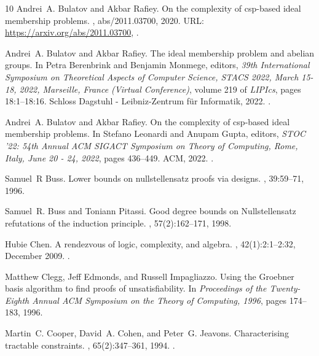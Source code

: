 \documentclass[11pt]{article}
\newcommand{\1}{\textbf{1}}
\begin{document}
\begin{thebibliography}{10}
Andrei~A. Bulatov and Akbar Rafiey.
\newblock On the complexity of csp-based ideal membership problems.
, abs/2011.03700, 2020.
\newblock URL: \url{https://arxiv.org/abs/2011.03700}, \href {https://arxiv.org/abs/2011.03700} {}.

Andrei~A. Bulatov and Akbar Rafiey.
\newblock The ideal membership problem and abelian groups.
\newblock In Petra Berenbrink and Benjamin Monmege, editors, {\em 39th International Symposium on Theoretical Aspects of Computer Science, {STACS} 2022, March 15-18, 2022, Marseille, France (Virtual Conference)}, volume 219 of {\em LIPIcs}, pages 18:1--18:16. Schloss Dagstuhl - Leibniz-Zentrum f{\"{u}}r Informatik, 2022.
\newblock \href {https://doi.org/10.4230/LIPIcs.STACS.2022.18} {}.

Andrei~A. Bulatov and Akbar Rafiey.
\newblock On the complexity of csp-based ideal membership problems.
\newblock In Stefano Leonardi and Anupam Gupta, editors, {\em {STOC} '22: 54th Annual {ACM} {SIGACT} Symposium on Theory of Computing, Rome, Italy, June 20 - 24, 2022}, pages 436--449. {ACM}, 2022.
\newblock \href {https://doi.org/10.1145/3519935.3520063} {}.

Samuel~R Buss.
\newblock Lower bounds on nullstellensatz proofs via designs.
, 39:59--71, 1996.

Samuel~R. Buss and Toniann Pitassi.
\newblock Good degree bounds on {N}ullstellensatz refutations of the induction principle.
, 57(2):162--171, 1998.

Hubie Chen.
\newblock A rendezvous of logic, complexity, and algebra.
, 42(1):2:1--2:32, December 2009.
\newblock \href {https://doi.org/10.1145/1592451.1592453} {}.

Matthew Clegg, Jeff Edmonds, and Russell Impagliazzo.
\newblock Using the {G}roebner basis algorithm to find proofs of unsatisfiability.
\newblock In {\em Proceedings of the Twenty-Eighth Annual {ACM} Symposium on the Theory of Computing, 1996}, pages 174--183, 1996.

Martin~C. Cooper, David~A. Cohen, and Peter~G. Jeavons.
\newblock Characterising tractable constraints.
, 65(2):347--361, 1994.
\newblock \href {https://doi.org/10.1016/0004-3702(94)90021-3} {}.


\end{thebibliography}
\end{document}

